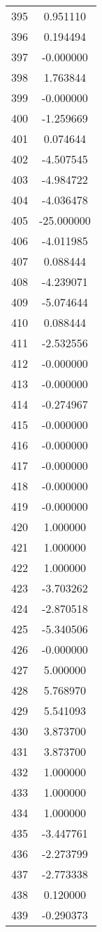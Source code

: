 \documentclass[12pt]{article}
\begin{document}
\begin{longtable}{@{}cc@{}}
395 & 0.951110 \\
396 & 0.194494 \\
397 & -0.000000 \\
398 & 1.763844 \\
399 & -0.000000 \\
400 & -1.259669 \\
401 & 0.074644 \\
402 & -4.507545 \\
403 & -4.984722 \\
404 & -4.036478 \\
405 & -25.000000 \\
406 & -4.011985 \\
407 & 0.088444 \\
408 & -4.239071 \\
409 & -5.074644 \\
410 & 0.088444 \\
411 & -2.532556 \\
412 & -0.000000 \\
413 & -0.000000 \\
414 & -0.274967 \\
415 & -0.000000 \\
416 & -0.000000 \\
417 & -0.000000 \\
418 & -0.000000 \\
419 & -0.000000 \\
420 & 1.000000 \\
421 & 1.000000 \\
422 & 1.000000 \\
423 & -3.703262 \\
424 & -2.870518 \\
425 & -5.340506 \\
426 & -0.000000 \\
427 & 5.000000 \\
428 & 5.768970 \\
429 & 5.541093 \\
430 & 3.873700 \\
431 & 3.873700 \\
432 & 1.000000 \\
433 & 1.000000 \\
434 & 1.000000 \\
435 & -3.447761 \\
436 & -2.273799 \\
437 & -2.773338 \\
438 & 0.120000 \\
439 & -0.290373 \\

\end{longtable}
\end{document}
